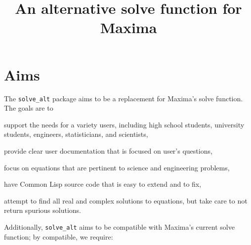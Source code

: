 \documentclass[]{scrartcl}
\title{An alternative solve function for Maxima}
\newcommand{\altsolve}{\texttt{solve\_alt}}
\begin{document}
\maketitle

\section{Aims}

The \altsolve\/ package aims to be a replacement for Maxima's solve function. The goals are to

\begin{alphalist}[noitemsep]

\item support the needs for a variety users, including high school students,  university students, engineers, statisticians, and scientists,

\item provide clear user documentation that is focused on user's questions,

\item focus on equations that are pertinent to science and engineering problems,

\item have Common Lisp source code that is easy to extend and to fix,

\item attempt to find all real and complex solutions to equations, but take care to not  return spurious solutions.

\end{alphalist}
Additionally, \altsolve\/  aims to be compatible with Maxima's current solve function; by compatible, we require:
\end{document}
